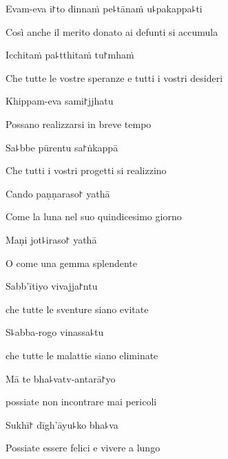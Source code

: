Evam-eva i꜓to dinnaṁ pe꜕tānaṁ u꜕pakappa꜕ti
 
\begin{english}
Così anche il merito donato ai defunti si accumula
\end{english}

Icchitaṁ pa꜕tthitaṁ tu꜓mhaṁ


\begin{english}
Che tutte le vostre speranze e tutti i vostri desideri
\end{english}

Khippam-eva sami꜓jjhatu

    
\begin{english}
Possano realizzarsi in breve tempo 
 \end{english}

Sa꜕bbe pūrentu sa꜓ṅkappā
 

\begin{english}
   Che tutti i vostri progetti si realizzino
\end{english}

Cando paṇṇaraso꜓ yathā

\begin{english}
Come la luna nel suo quindicesimo giorno
\end{english}

Maṇi jot꜕iraso꜓ yathā
 
\begin{english}
 O come una gemma splendente
\end{english}

Sabb'ītiyo vivajja꜓ntu


\begin{english}
che tutte le sventure siano evitate
\end{english}

S꜕abba-rogo vinassa꜕tu

\begin{english}
che tutte le malattie siano eliminate
\end{english}

Mā te bha꜕vatv-antarā꜓yo


\begin{english}
 possiate non incontrare mai pericoli
\end{english}

Sukhī꜓ dīgh'āyu꜕ko bha꜕va

\begin{english}
Possiate essere felici e vivere a lungo
\end{english}


